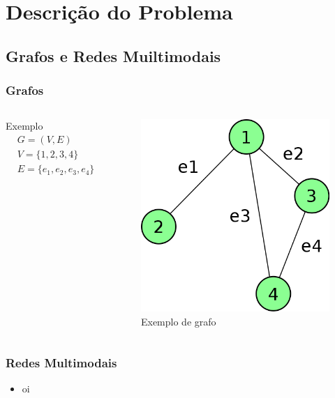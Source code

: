 \section{Descrição do Problema}

\subsection{Grafos e Redes Muiltimodais}
\frame
{
\frametitle{Grafos}
\begin{columns}[c]
\column{1.5in}
	\begin{exampleblock}{Exemplo}
	\begin{align*}
		& G = (V,E) \\
		& V = \{1,2,3,4\} \\
		& E = \{e_1,e_2,e_3,e_4\} \\
	\end{align*}
	\end{exampleblock}
\column{1.5in}
	\begin{figure}
		\includegraphics[width=\textwidth]{./imgs/grafo.png}
		\caption{Exemplo de grafo}
	\end{figure}
\end{columns}
}

\frame
{
\frametitle{Redes Multimodais}
\begin{itemize}
	\item oi
\end{itemize}
}
